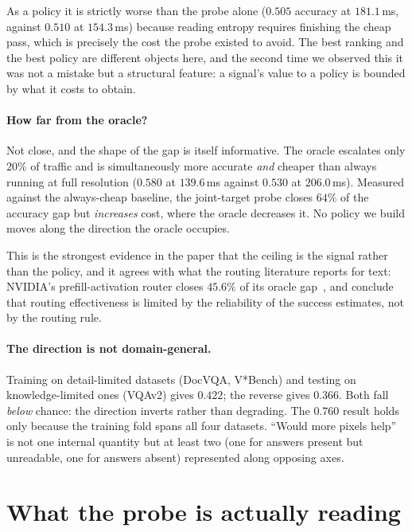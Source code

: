 \documentclass[10pt,twocolumn]{article}
\theoremstyle{plain}
\begin{document}
As a policy it is strictly worse than the probe alone ($0.505$ accuracy at $181.1$\,ms, against $0.510$ at $154.3$\,ms) because reading entropy requires
finishing the cheap pass, which is precisely the cost the probe existed to
avoid. The best ranking and the best policy are different objects here, and the
second time we observed this it was not a mistake but a structural feature: a
signal's value to a policy is bounded by what it costs to obtain.

\paragraph{How far from the oracle?} Not close, and the shape of the gap is
itself informative. The oracle escalates only $20\%$ of traffic and is
simultaneously more accurate \emph{and} cheaper than always running at full
resolution ($0.580$ at $139.6$\,ms against $0.530$ at $206.0$\,ms). Measured
against the always-cheap baseline, the joint-target probe closes $64\%$ of the
accuracy gap but \emph{increases} cost, where the oracle decreases it. No
policy we build moves along the direction the oracle occupies.

This is the strongest evidence in the paper that the ceiling is the signal
rather than the policy, and it agrees with what the routing literature reports
for text: NVIDIA's prefill-activation router closes $45.6\%$ of its oracle
gap~\cite{llmrouter}, and \cite{lugoloobi} conclude that routing effectiveness
is limited by the reliability of the success estimates, not by the routing rule.

\paragraph{The direction is not domain-general.} Training on detail-limited
datasets (DocVQA, V*Bench) and testing on knowledge-limited ones (VQAv2) gives
$0.422$; the reverse gives $0.366$. Both fall \emph{below} chance: the direction
inverts rather than degrading. The $0.760$ result holds only because the
training fold spans all four datasets. ``Would more pixels help'' is not one
internal quantity but at least two (one for answers present but unreadable, one for answers absent) represented along opposing axes.

\section{What the probe is actually reading}
\label{sec:confound}
\end{document}
